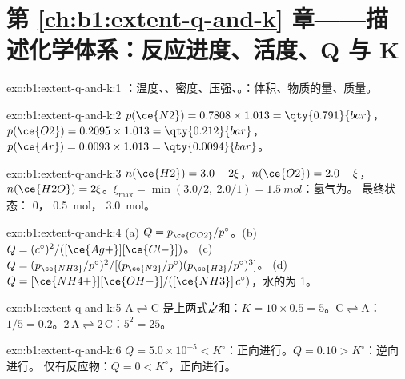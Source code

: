 \section*{第 \ref{ch:b1:extent-q-and-k} 章——描述化学体系：反应进度、活度、Q 与 K}

\begin{solution}{exo:b1:extent-q-and-k:1}
：温度、、密度、压强、。：体积、物质的量、质量。
\end{solution}

\begin{solution}{exo:b1:extent-q-and-k:2}
$p(\ce{N2}) = 0.7808 \times 1.013 = \qty{0.791}{bar}$，$p(\ce{O2}) =
0.2095 \times 1.013 = \qty{0.212}{bar}$，$p(\ce{Ar}) = 0.0093 \times 1.013
= \qty{0.0094}{bar}$。
\end{solution}

\begin{solution}{exo:b1:extent-q-and-k:3}
$n(\ce{H2}) = 3.0 - 2\xi$，$n(\ce{O2}) = 2.0 - \xi$，$n(\ce{H2O}) =
2\xi$。$\xi_{\max} = \min(3.0/2,\ 2.0/1) = \qty{1.5}{mol}$：氢气为。
最终状态： 0， \qty{0.5}{mol}，
\qty{3.0}{mol}。
\end{solution}

\begin{solution}{exo:b1:extent-q-and-k:4}
(a) $Q = p_{\ce{CO2}}/p^\circ$。(b) $Q = (c^\circ)^2/([\ce{Ag+}][\ce{Cl-}])$。
(c) $Q = (p_{\ce{NH3}}/p^\circ)^2/[(p_{\ce{N2}}/p^\circ)(p_{\ce{H2}}/p^\circ)^3]$。
(d) $Q = [\ce{NH4+}][\ce{OH-}]/([\ce{NH3}]\,c^\circ)$，水的为 1。
\end{solution}

\begin{solution}{exo:b1:extent-q-and-k:5}
$\mathrm{A \rightleftharpoons C}$ 是上两式之和：$K = 10 \times 0.5 = 5$。$\mathrm{C \rightleftharpoons A}$：$1/5 =
0.2$。$\mathrm{2\,A \rightleftharpoons 2\,C}$：$5^2 = 25$。
\end{solution}

\begin{solution}{exo:b1:extent-q-and-k:6}
$Q = 5.0 \times 10^{-5} < K^\circ$：正向进行。$Q = 0.10 > K^\circ$：逆向进行。
仅有反应物：$Q = 0 < K^\circ$，正向进行。
\end{solution}

